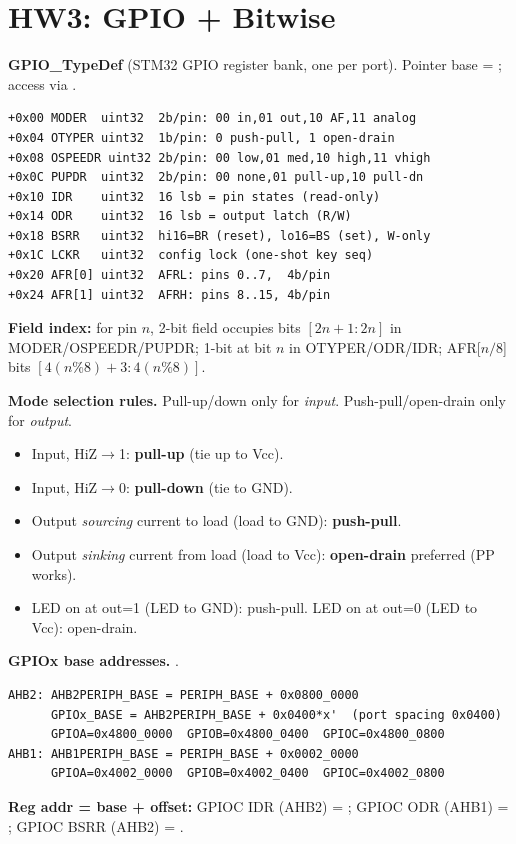 \section{HW3: GPIO + Bitwise}

\textbf{GPIO\_TypeDef} (STM32 GPIO register bank, one per port). Pointer base = ; access via .
\begin{lstlisting}[language={}]
+0x00 MODER  uint32  2b/pin: 00 in,01 out,10 AF,11 analog
+0x04 OTYPER uint32  1b/pin: 0 push-pull, 1 open-drain
+0x08 OSPEEDR uint32 2b/pin: 00 low,01 med,10 high,11 vhigh
+0x0C PUPDR  uint32  2b/pin: 00 none,01 pull-up,10 pull-dn
+0x10 IDR    uint32  16 lsb = pin states (read-only)
+0x14 ODR    uint32  16 lsb = output latch (R/W)
+0x18 BSRR   uint32  hi16=BR (reset), lo16=BS (set), W-only
+0x1C LCKR   uint32  config lock (one-shot key seq)
+0x20 AFR[0] uint32  AFRL: pins 0..7,  4b/pin
+0x24 AFR[1] uint32  AFRH: pins 8..15, 4b/pin
\end{lstlisting}
\textbf{Field index:} for pin $n$, 2-bit field occupies bits $[2n+1{:}2n]$ in MODER/OSPEEDR/PUPDR; 1-bit at bit $n$ in OTYPER/ODR/IDR; AFR[$n/8$] bits $[4(n\%8)+3{:}4(n\%8)]$.

\textbf{Mode selection rules.} Pull-up/down only for \emph{input}. Push-pull/open-drain only for \emph{output}.
\begin{itemize}
\item Input, HiZ$\to$1: \textbf{pull-up} (tie up to Vcc).
\item Input, HiZ$\to$0: \textbf{pull-down} (tie to GND).
\item Output \emph{sourcing} current to load (load to GND): \textbf{push-pull}.
\item Output \emph{sinking} current from load (load to Vcc): \textbf{open-drain} preferred (PP works).
\item LED on at out=1 (LED to GND): push-pull. LED on at out=0 (LED to Vcc): open-drain.
\end{itemize}

\textbf{GPIOx base addresses.} .
\begin{lstlisting}[language={}]
AHB2: AHB2PERIPH_BASE = PERIPH_BASE + 0x0800_0000
      GPIOx_BASE = AHB2PERIPH_BASE + 0x0400*x'  (port spacing 0x0400)
      GPIOA=0x4800_0000  GPIOB=0x4800_0400  GPIOC=0x4800_0800
AHB1: AHB1PERIPH_BASE = PERIPH_BASE + 0x0002_0000
      GPIOA=0x4002_0000  GPIOB=0x4002_0400  GPIOC=0x4002_0800
\end{lstlisting}
\textbf{Reg addr = base + offset:} GPIOC IDR (AHB2) = ; GPIOC ODR (AHB1) = ; GPIOC BSRR (AHB2) = .

